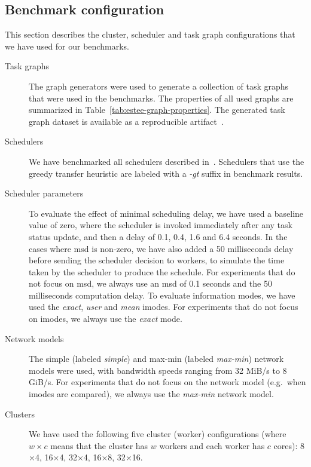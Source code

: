 \subsection{Benchmark configuration}
This section describes the cluster, scheduler and task graph configurations that we have used for
our benchmarks.

\begin{description}
	\item[Task graphs] The \estee{} graph generators were used to generate a collection of task graphs that
		were used in the benchmarks. The properties of all used graphs are summarized in
		Table~\ref{tab:estee-graph-properties}. The generated task graph dataset is available as a reproducible
		artifact~\cite{estee_graphs}.
	\item[Schedulers] We have benchmarked all schedulers described in~. Schedulers that use the
		greedy transfer heuristic are labeled with a \emph{-gt} suffix in benchmark results.
	\item[Scheduler parameters] To evaluate the effect of minimal scheduling delay, we have used a baseline value of zero, where
		the scheduler is invoked immediately after any task status update, and then a delay of 0.1, 0.4,
		1.6 and 6.4 seconds. In the cases where \gls{msd} is non-zero, we have also added a 50
		milliseconds delay before sending the scheduler decision to workers, to simulate the time taken by
		the scheduler to produce the schedule. For experiments that do not focus on \gls{msd},
		we always use an \gls{msd} of 0.1 seconds and the 50 milliseconds computation delay.
		To evaluate information modes, we have used the \emph{exact}, \emph{user} and
		\emph{mean} imodes. For experiments that do not focus on imodes, we always use the
		\emph{exact} mode.
	\item[Network models] The simple (labeled \emph{simple}) and max-min (labeled \emph{max-min}) network
		models were used, with bandwidth speeds ranging from 32 MiB/s to 8 GiB/s. For experiments that do
		not focus on the network model (e.g.\ when imodes are compared), we always use the
		\emph{max-min} network model.
	\item[Clusters] We have used the following five cluster (worker) configurations (where $w \times c$ means
		that the cluster has $w$ workers and each worker has $c$
		cores):  8$\times$4, 16$\times$4, 32$\times$4,
		16$\times$8, 32$\times$16.
\end{description}

